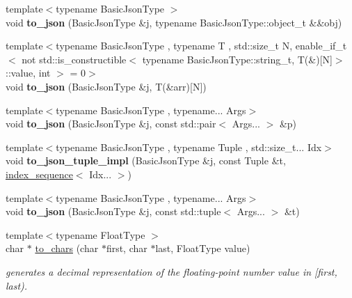 \begin{DoxyCompactItemize}
\item 
{\footnotesize template$<$typename Basic\+Json\+Type $>$ }\\void {\bfseries to\+\_\+json} (Basic\+Json\+Type \&j, typename Basic\+Json\+Type\+::object\+\_\+t \&\&obj)\hypertarget{namespacenlohmann_1_1detail_ac9f7a5542851c61d93740148eaec509f}{}\label{namespacenlohmann_1_1detail_ac9f7a5542851c61d93740148eaec509f}

\item 
{\footnotesize template$<$typename Basic\+Json\+Type , typename T , std\+::size\+\_\+t N, enable\+\_\+if\+\_\+t$<$ not std\+::is\+\_\+constructible$<$ typename Basic\+Json\+Type\+::string\+\_\+t, T(\&)\mbox{[}\+N\mbox{]}$>$\+::value, int $>$  = 0$>$ }\\void {\bfseries to\+\_\+json} (Basic\+Json\+Type \&j, T(\&arr)\mbox{[}N\mbox{]})\hypertarget{namespacenlohmann_1_1detail_a8c4d301fc51996e3c5c1257fb92ace20}{}\label{namespacenlohmann_1_1detail_a8c4d301fc51996e3c5c1257fb92ace20}

\item 
{\footnotesize template$<$typename Basic\+Json\+Type , typename... Args$>$ }\\void {\bfseries to\+\_\+json} (Basic\+Json\+Type \&j, const std\+::pair$<$ Args... $>$ \&p)\hypertarget{namespacenlohmann_1_1detail_aa30611f74062379d3420c40487cf3bb3}{}\label{namespacenlohmann_1_1detail_aa30611f74062379d3420c40487cf3bb3}

\item 
{\footnotesize template$<$typename Basic\+Json\+Type , typename Tuple , std\+::size\+\_\+t... Idx$>$ }\\void {\bfseries to\+\_\+json\+\_\+tuple\+\_\+impl} (Basic\+Json\+Type \&j, const Tuple \&t, \hyperlink{structnlohmann_1_1detail_1_1index__sequence}{index\+\_\+sequence}$<$ Idx... $>$)\hypertarget{namespacenlohmann_1_1detail_a510dfa15b01e9a8afe31600a27b28199}{}\label{namespacenlohmann_1_1detail_a510dfa15b01e9a8afe31600a27b28199}

\item 
{\footnotesize template$<$typename Basic\+Json\+Type , typename... Args$>$ }\\void {\bfseries to\+\_\+json} (Basic\+Json\+Type \&j, const std\+::tuple$<$ Args... $>$ \&t)\hypertarget{namespacenlohmann_1_1detail_aa7a47b08eee864c2c108c04954919648}{}\label{namespacenlohmann_1_1detail_aa7a47b08eee864c2c108c04954919648}

\item 
{\footnotesize template$<$typename Float\+Type $>$ }\\char $\ast$ \hyperlink{namespacenlohmann_1_1detail_a6192f1eab05fbbc5c35edb8368c8fc57}{to\+\_\+chars} (char $\ast$first, char $\ast$last, Float\+Type value)
\begin{DoxyCompactList}\small\item\em generates a decimal representation of the floating-\/point number value in \mbox{[}first, last). \end{DoxyCompactList}\end{DoxyCompactItemize}


